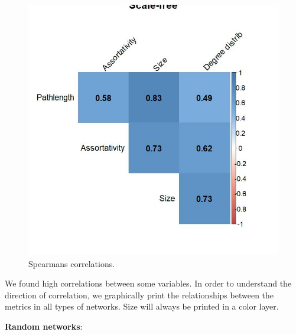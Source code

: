 \documentclass[
]{article}
\begin{document}
\begin{figure}[!H]

{\centering \includegraphics{./Figures/unnamed-chunk-79-3} 

}

\caption{Spearmans correlations.}\label{fig:unnamed-chunk-79-3}
\end{figure}

We found high correlations between some variables. In order to
understand the direction of correlation, we graphically print the
relationships between the metrics in all types of networks. Size will
always be printed in a color layer.

\textbf{Random networks}:
\end{document}
